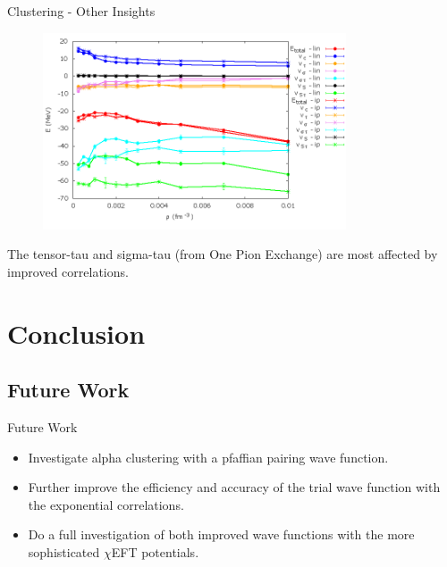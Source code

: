 \documentclass{beamer}
\begin{document}
\begin{frame}{Clustering - Other Insights}
\begin{figure}[h!]
   \centering
   \includegraphics[width=0.8\textwidth]{../figures/av6_alpha.png}
\end{figure}
The tensor-tau and sigma-tau (from One Pion Exchange) are most affected by improved correlations.
\end{frame}

\section{Conclusion}
\subsection{Future Work}
\begin{frame}{Future Work}
\begin{itemize}
   \item Investigate alpha clustering with a pfaffian pairing wave function.
   \item Further improve the efficiency and accuracy of the trial wave function with the exponential correlations.
   \item Do a full investigation of both improved wave functions with the more sophisticated $\chi$EFT potentials.
\end{itemize}
\end{frame}
\end{document}
